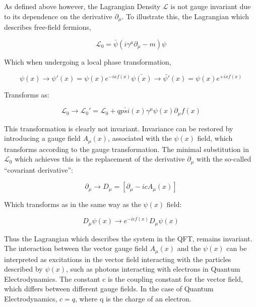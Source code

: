 As defined above however, the Lagrangian Density $\mathcal{L}$ is not gauge invariant due to its dependence on the derivative $\partial _{\mu}$. To illustrate this, the Lagrangian which describes free-field fermions\cite{QFT}, 

\begin{equation}
\mathcal{L}_{0} = \bar{\psi}(i\gamma^{\mu}\partial_{\mu} - m)\psi
\end{equation}

Which when undergoing a local phase transformation,

\begin{equation}
\psi(x) \rightarrow \psi'(x) = \psi(x)e^{-ixf(x)}
\bar{\psi(x)} \rightarrow \bar{\psi'}(x) = \psi(x)e^{+ixf(x)}
\end{equation}

Transforms as:

\begin{equation}
\mathcal{L}_{0} \rightarrow \mathcal{L}_{0}' = \mathcal{L}_{0} + q \bar{psi}(x)\gamma^{\mu}\psi(x)\partial_{\mu}f(x)
\end{equation}

This transformation is clearly not invariant. Invariance can be restored by introducing a gauge field $A_{\mu}(x)$, associated with the $\psi(x)$ field, which transforms according to the gauge transformation. 
The minimal substitution in $\mathcal{L}_{0}$ which achieves this is the replacement of the derivative $\partial_{\mu}$  with the so-called ``covariant derivative''\cite{QFT}:

\begin{equation}
\partial_{\mu} \rightarrow D_{\mu} = [ \partial_{\mu} - icA_{\mu}(x) ]
\end{equation}

Which transforms as in the same way as the $\psi(x)$ field:

\begin{equation}
D_{\mu}\psi(x) \rightarrow e^{-icf(x)}D_{\mu}\psi(x)
\end{equation}

Thus the Lagrangian which describes the system in the QFT, remains invariant. 
The interaction between the vector gauge field $A_{\mu}(x)$ and the $\psi(x)$ can be interpreted as excitations in the vector field interacting with the particles described by $\psi(x)$, such as photons interacting with electrons in Quantum Electrodynamics. 
The constant c is the coupling constant for the vector field, which differs between different gauge fields. 
In the case of Quantum Electrodynamics, $c = q$, where q is the charge of an electron\cite{QFT}.

